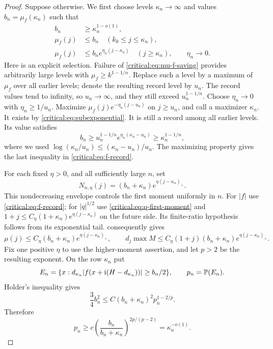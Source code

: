 \begin{proof}
Suppose otherwise. We first choose levels \(\kappa_n\to\infty\)
and values \(b_n=\mu_f(\kappa_n)\) such that
\begin{equation}\label{critical:eq:f-record}
 \begin{split}
 b_n&\ge\kappa_n^{1-o(1)},\\
 \mu_f(j)&\le b_n\quad(k_0\le j\le\kappa_n),\\
 \mu_f(j)&\le b_n e^{\eta_n(j-\kappa_n)}
       \quad(j\ge\kappa_n),\qquad \eta_n\to0.
 \end{split}
\end{equation}
Here is an explicit selection. Failure of
\eqref{critical:eq:mu-f-saving} provides arbitrarily large levels
with \(\mu_f\ge k^{1-1/n}\). Replace such a level by a maximum
of \(\mu_f\) over all earlier levels; denote the resulting record
level by \(u_n\). The record values tend to infinity, so
\(u_n\to\infty\), and they still exceed \(u_n^{1-1/n}\).
Choose \(\eta_n\to0\) with \(\eta_n\ge1/u_n\). Maximize
\(\mu_f(j)e^{-\eta_n(j-u_n)}\) on \(j\ge u_n\), and call a
maximizer \(\kappa_n\). It exists by
\eqref{critical:eq:subexponential}. It is still a record among all
earlier levels. Its value satisfies
\[
 b_n\ge u_n^{1-1/n}e^{\eta_n(\kappa_n-u_n)}
       \ge\kappa_n^{1-1/n},
\]
where we used \(\log(\kappa_n/u_n)\le(\kappa_n-u_n)/u_n\).
The maximizing property gives the last inequality in
\eqref{critical:eq:f-record}.

For each fixed \(\eta>0\), and all sufficiently large \(n\), set
\[
 N_{n,\eta}(j)=(b_n+\kappa_n)
                   e^{\eta(j-\kappa_n)_+}.
\]
This nondecreasing envelope controls the first moment uniformly in
\(n\). For \(|f|\) use \eqref{critical:eq:f-record}; for
\(|q|^{1/2}\) use \eqref{critical:eq:q-first-moment} and
\(1+j\le C_\eta(1+\kappa_n)e^{\eta(j-\kappa_n)}\) on the
future side. Its finite-ratio hypothesis follows from its exponential
tail.  consequently gives
\begin{equation}\label{critical:eq:record-envelope}
 \mu(j)\le C_\eta(b_n+\kappa_n)e^{\eta(j-\kappa_n)_+},\qquad
 d_j\max M\le C_\eta(1+j)(b_n+\kappa_n)
                         e^{\eta(j-\kappa_n)_+}.
\end{equation}
Fix one positive \(\eta\) to use the higher-moment assertion, and
let \(p>2\) be the resulting exponent. On the row \(\kappa_n\)
put
\[
 E_n=\{x:d_{\kappa_n}|f(x+\mathrm i(H-d_{\kappa_n}))|\ge b_n/2\},
 \qquad p_n=\mathbb P(E_n).
\]
Holder's inequality gives
\[
 \frac34 b_n^2
 \le C(b_n+\kappa_n)^2p_n^{1-2/p}.
\]
Therefore
\begin{equation}\label{critical:eq:event-cost}
 p_n\ge c\left(\frac{b_n}{b_n+\kappa_n}\right)^{2p/(p-2)}
       =\kappa_n^{-o(1)}.
\end{equation}


\end{proof}
